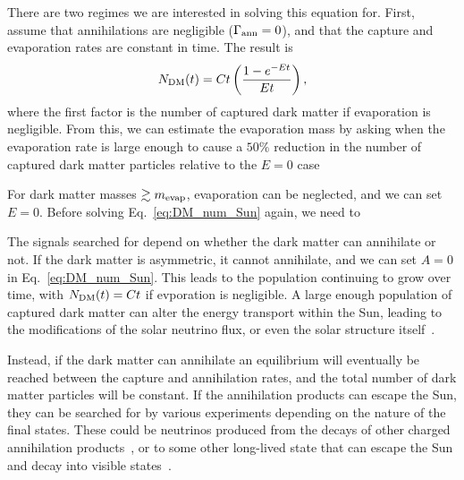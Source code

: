 There are two regimes we are interested in solving this equation for. First, assume that annihilations are negligible  ($\Gamma_\mathrm{ann} = 0$), and that the capture and evaporation rates are constant in time. The result is
\begin{equation}
    N_\mathrm{DM}(t) = Ct\left(\frac{1 - e^{-E t}}{E t}\right), 
\end{equation}
where the first factor is the number of captured dark matter if evaporation is negligible. From this, we can estimate the evaporation mass by asking when the evaporation rate is large enough to cause a $50\%$ reduction in the number of captured dark matter particles relative to the $E=0$ case

For dark matter masses $\gtrsim m_\mathrm{evap}$, evaporation can be neglected, and we can set $E=0$. Before solving Eq.~\ref*{eq:DM_num_Sun} again, we need to 


The signals searched for depend on whether the dark matter can annihilate or not. If the dark matter is asymmetric, it cannot annihilate, and we can set $A = 0$ in Eq.~\ref*{eq:DM_num_Sun}. This leads to the population continuing to grow over time, with $N_\mathrm{DM}(t) = Ct$ if evporation is negligible. A large enough population of captured dark matter can alter the energy transport within the Sun, leading to the modifications of the solar neutrino flux, or even the solar structure itself~\cite{Franarin:2018gfk_jun_JUNOSensitivityResonant, Cumberbatch:2010hh_LightWIMPsSun, Vincent:2013lua_apr_Thermalconductiondark,Vincent:2015gqa_aug_Generalisedformfactor}. 

Instead, if the dark matter can annihilate an equilibrium will eventually be reached between the capture and annihilation rates, and the total number of dark matter particles will be constant. If the annihilation products can escape the Sun, they can be searched for by various experiments depending on the nature of the final states.
These could be neutrinos produced from the decays of other charged annihilation products~\cite{Super-Kamiokande:2011wjy_IndirectSearchWIMPs,Super-Kamiokande:2015xms_apr_Searchneutrinosannihilation,ANTARES:2016obx_may_SearchSecludedDark,ANTARES:2016xuh_aug_LimitsDarkMatter,IceCube:2016dgk_Searchannihilatingdark}, or to some other long-lived state that can escape the Sun and decay into visible states~\cite{Batell:2009zp_SolarGammaRays,Schuster:2009au_TerrestrialSolarLimits,Bell:2011sn_Enhancedneutrinosignals,Feng:2016ijc_jun_DarkSunshineDetecting,Leane:2017vag_jun_PowerfulSolarSignatures}.


